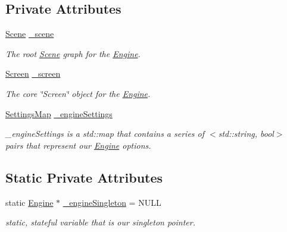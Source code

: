 \subsection*{Private Attributes}
\begin{DoxyCompactItemize}
\item 
\hypertarget{class_engine_afc244649d4b31f59f2ef91754472b281}{\hyperlink{class_scene}{Scene} \hyperlink{class_engine_afc244649d4b31f59f2ef91754472b281}{\-\_\-scene}}\label{class_engine_afc244649d4b31f59f2ef91754472b281}

\begin{DoxyCompactList}\small\item\em The root \hyperlink{class_scene}{Scene} graph for the \hyperlink{class_engine}{Engine}. \end{DoxyCompactList}\item 
\hypertarget{class_engine_a181e11b6fd26698bc173647ab2471c8c}{\hyperlink{class_screen}{Screen} \hyperlink{class_engine_a181e11b6fd26698bc173647ab2471c8c}{\-\_\-screen}}\label{class_engine_a181e11b6fd26698bc173647ab2471c8c}

\begin{DoxyCompactList}\small\item\em The core \char`\"{}\-Screen\char`\"{} object for the \hyperlink{class_engine}{Engine}. \end{DoxyCompactList}\item 
\hypertarget{class_engine_a467d917952b89ef23f7a045e4f87218a}{\hyperlink{_engine_8hpp_a35f3ec1606bb0642e48d2e62fea0d6a6}{Settings\-Map} \hyperlink{class_engine_a467d917952b89ef23f7a045e4f87218a}{\-\_\-engine\-Settings}}\label{class_engine_a467d917952b89ef23f7a045e4f87218a}

\begin{DoxyCompactList}\small\item\em \-\_\-engine\-Settings is a std\-::map that contains a series of $<$std\-::string, bool$>$ pairs that represent our \hyperlink{class_engine}{Engine} options. \end{DoxyCompactList}\end{DoxyCompactItemize}
\subsection*{Static Private Attributes}
\begin{DoxyCompactItemize}
\item 
\hypertarget{class_engine_ae494a590056c4594f1f3cb39e4d18994}{static \hyperlink{class_engine}{Engine} $\ast$ \hyperlink{class_engine_ae494a590056c4594f1f3cb39e4d18994}{\-\_\-engine\-Singleton} = N\-U\-L\-L}\label{class_engine_ae494a590056c4594f1f3cb39e4d18994}

\begin{DoxyCompactList}\small\item\em static, stateful variable that is our singleton pointer. \end{DoxyCompactList}\end{DoxyCompactItemize}


